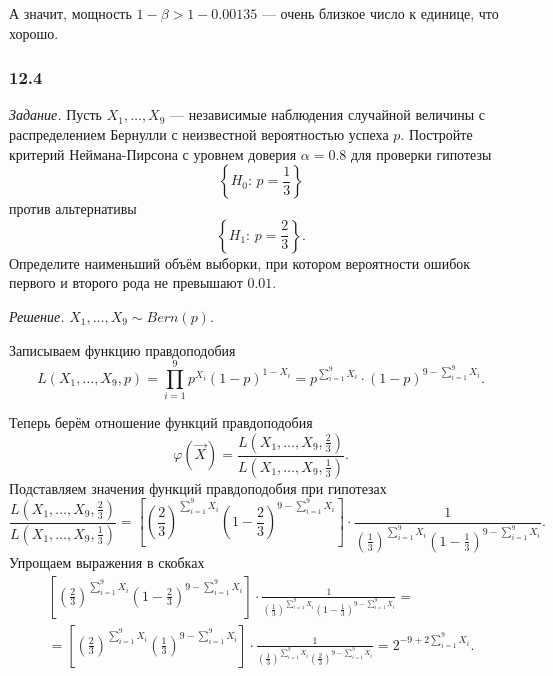 А значит, мощность $1 - \beta > 1 - 0.00135$ --- очень близкое число к единице, что хорошо.

\subsubsection*{12.4}

\textit{Задание.}
Пусть $X_1, \dotsc, X_9$ ---
независимые наблюдения случайной
величины с распределением Бернулли с неизвестной вероятностью успеха $p$.
Постройте критерий Неймана-Пирсона с уровнем доверия $ \alpha = 0.8$ для проверки гипотезы
$$ \left\{ H_0: \, p = \frac{1}{3} \right\} $$
против альтернативы
$$ \left\{ H_1: \, p = \frac{2}{3} \right\}.$$
Определите наименьший объём выборки,
при котором вероятности ошибок первого и второго рода не превышают $0.01$.

\textit{Решение.} $X_1, \dotsc, X_9 \sim Bern \left( p \right) $.

Записываем функцию правдоподобия
$$L \left( X_1, \dotsc, X_9, p \right) =
  \prod \limits_{i = 1}^9 p^{X_i} \left( 1 - p \right)^{1 - X_i} =
  p^{ \sum \limits_{i = 1}^9 X_i} \cdot \left( 1 - p \right)^{9 - \sum \limits_{i = 1}^9 X_i}.$$

Теперь берём отношение функций правдоподобия
$$ \varphi \left( \vec{X} \right) =
  \frac{L \left( X_1, \dotsc, X_9, \frac{2}{3} \right) }{L \left( X_1, \dotsc, X_9, \frac{1}{3} \right) }.$$
Подставляем значения функций правдоподобия при гипотезах
$$ \frac{L \left( X_1, \dotsc, X_9, \frac{2}{3} \right) }{L \left( X_1, \dotsc, X_9, \frac{1}{3} \right) } =
  \left[ \left( \frac{2}{3} \right)^{ \sum \limits_{i = 1}^9 X_i} \left( 1 - \frac{2}{3} \right)^{9 - \sum \limits_{i = 1}^9 X_i} \right] \cdot
  \frac{1}{ \left( \frac{1}{3} \right)^{ \sum \limits_{i = 1}^9 X_i} \left( 1 - \frac{1}{3} \right)^{9 - \sum \limits_{i = 1}^9 X_i}}.$$
Упрощаем выражения в скобках
\begin{equation*}
  \begin{split}
    \left[ \left( \frac{2}{3} \right)^{ \sum \limits_{i = 1}^9 X_i} \left( 1 - \frac{2}{3} \right)^{9 - \sum \limits_{i = 1}^9 X_i} \right] \cdot
    \frac{1}{ \left( \frac{1}{3} \right)^{ \sum \limits_{i = 1}^9 X_i} \left( 1 - \frac{1}{3} \right)^{9 - \sum \limits_{i = 1}^9 X_i}} = \\
    = \left[ \left( \frac{2}{3} \right)^{ \sum \limits_{i = 1}^9 X_i} \left( \frac{1}{3} \right)^{9 - \sum \limits_{i = 1}^9 X_i} \right] \cdot
    \frac{1}{ \left( \frac{1}{3} \right)^{ \sum \limits_{i = 1}^9 X_i} \left( \frac{2}{3} \right)^{9 - \sum \limits_{i = 1}^9 X_i}} =
    2^{-9 + 2 \sum \limits_{i = 1}^9 X_i}.
  \end{split}
\end{equation*}

